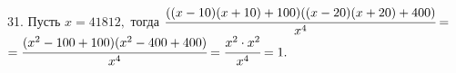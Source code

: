 31. Пусть $x=41812,$ тогда $\cfrac{((x-10)(x+10)+100)((x-20)(x+20)+400)}{x^4}=$\\$=\cfrac{(x^2-100+100)(x^2-400+400)}{x^4}=
\cfrac{x^2\cdot x^2 }{x^4}=1.$\\
